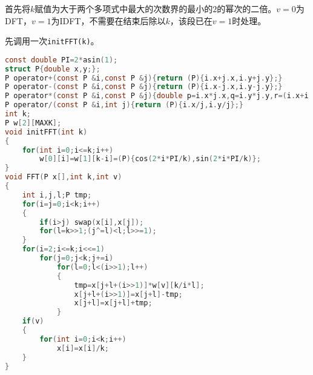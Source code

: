首先将$k$赋值为大于两个多项式中最大的次数界的最小的$2$的幂次的二倍。$v = 0$为DFT，$v = 1$为IDFT，不需要在结束后除以$k$，该段已在$v=1$时处理。

先调用一次\texttt{initFFT(k)}。
\begin{lstlisting}[language=C]
const double PI=2*asin(1);
struct P{double x,y;};
P operator+(const P &i,const P &j){return (P){i.x+j.x,i.y+j.y};}
P operator-(const P &i,const P &j){return (P){i.x-j.x,i.y-j.y};}
P operator*(const P &i,const P &j){double p=i.x*j.x,q=i.y*j.y,r=(i.x+i.y)*(j.x+j.y);return (P){p-q,r-p-q};}
P operator/(const P &i,int j){return (P){i.x/j,i.y/j};}
int k;
P w[2][MAXK];
void initFFT(int k)
{
    for(int i=0;i<=k;i++)
        w[0][i]=w[1][k-i]=(P){cos(2*i*PI/k),sin(2*i*PI/k)};
}
void FFT(P x[],int k,int v)
{
	int i,j,l;P tmp;
	for(i=j=0;i<k;i++)
	{
		if(i>j) swap(x[i],x[j]);
		for(l=k>>1;(j^=l)<l;l>>=1);
	}
	for(i=2;i<=k;i<<=1)
		for(j=0;j<k;j+=i)
			for(l=0;l<(i>>1);l++)
			{
				tmp=x[j+l+(i>>1)]*w[v][k/i*l];
				x[j+l+(i>>1)]=x[j+l]-tmp;
				x[j+l]=x[j+l]+tmp;
			}
    if(v)
    {
        for(int i=0;i<k;i++)
            x[i]=x[i]/k;
    }
}
\end{lstlisting}